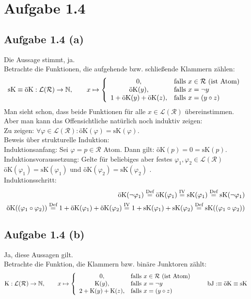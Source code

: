 \documentclass[12pt,a4paper]{article}
\newcommand{\ok}{\text{öK}}
\newcommand{\sk}{\text{sK}}
\renewcommand{\k}{\text{K}}
\newcommand{\bj}{\text{bJ}}
\begin{document}
\section*{Aufgabe 1.4}
\subsection*{Aufgabe 1.4 (a)}
Die Aussage stimmt, ja.\\
Betrachte die Funktionen, die aufgehende bzw. schließende Klammern zählen:
\begin{align*}
\sk\equiv\ok:\mathcal{L}(\mathcal{R})\to\N,\qquad
x\mapsto\left\lbrace\begin{array}{cl}
0, & \falls x\in\mathcal{R}\text{ (ist Atom)}\\
\ok(y), & \falls x=\neg y\\
1+\ok(y)+\ok(z), & \falls x=(y\circ z)
\end{array}\right.
\end{align*}
Man sieht schon, dass beide Funktionen für alle $x\in\mathcal{L}(\mathcal{R})$ übereinstimmen. Aber man kann das Offensichtliche natürlich noch induktiv zeigen:\\

Zu zeigen: $\forall\varphi\in\mathcal{L}(\mathcal{R}):\ok(\varphi)=\sk(\varphi)$.\\
Beweis über strukturelle Induktion:\\
Induktionsanfang: Sei $\varphi=p\in\mathcal{R}$ Atom. Dann gilt: $\ok(p)=0=\sk(p)$.\\
Induktionsvoraussetzung: Gelte für beliebiges aber festes $\varphi_1,\varphi_2\in\mathcal{L}(\mathcal{R})$\\ $\ok(\varphi_1)=\sk(\varphi_1)$ und $\ok(\varphi_2)=\sk(\varphi_2)$ .\\ 
Induktionsschritt:
\begin{align*}
\ok(\neg \varphi_1)
\stackeq{\text{Def}}\ok(\varphi_1)
\stackeq{\text{IV}}\sk(\varphi_1)
\stackeq{\text{Def}}\sk(\neg \varphi_1)\\
\ok((\varphi_1\circ \varphi_2))
\stackeq{\text{Def}}1+\ok(\varphi_1)+\ok(\varphi_2)
\stackeq{\text{IV}}1+\sk(\varphi_1)+\sk(\varphi_2)
\stackeq{\text{Def}}\sk((\varphi_1\circ \varphi_2))
\end{align*}

\subsection*{Aufgabe 1.4 (b)}
Ja, diese Aussagen gilt.\\
Betrachte die Funktion, die Klammern bzw. binäre Junktoren zählt:
\begin{align*}
\k:\mathcal{L}(\mathcal{R})\to\N,\qquad
x\mapsto\left\lbrace\begin{array}{cl}
0, & \falls x\in\mathcal{R}\text{ (ist Atom)}\\
\k(y), & \falls x=\neg y\\
2+\k(y)+\k(z), & \falls x=(y\circ z)
\end{array}\right.\qquad \bj:\equiv \ok\equiv\sk
\end{align*}
\end{document}
